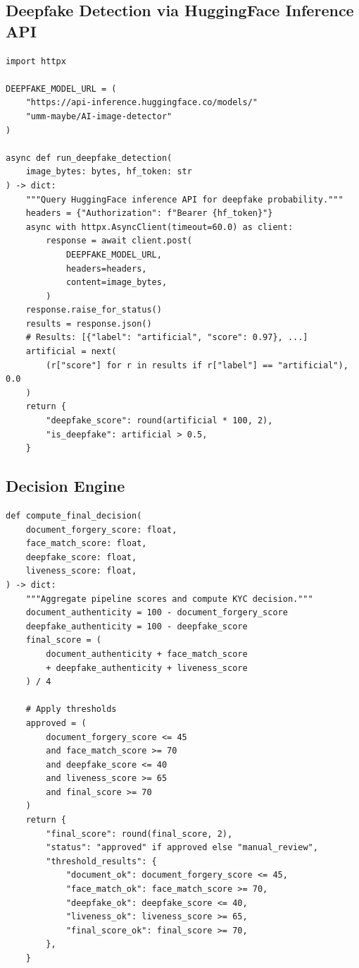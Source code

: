 \subsection{Deepfake Detection via HuggingFace Inference API}

\begin{lstlisting}[style=pythonstyle, caption=HuggingFace Deepfake Detection Client]
import httpx

DEEPFAKE_MODEL_URL = (
    "https://api-inference.huggingface.co/models/"
    "umm-maybe/AI-image-detector"
)

async def run_deepfake_detection(
    image_bytes: bytes, hf_token: str
) -> dict:
    """Query HuggingFace inference API for deepfake probability."""
    headers = {"Authorization": f"Bearer {hf_token}"}
    async with httpx.AsyncClient(timeout=60.0) as client:
        response = await client.post(
            DEEPFAKE_MODEL_URL,
            headers=headers,
            content=image_bytes,
        )
    response.raise_for_status()
    results = response.json()
    # Results: [{"label": "artificial", "score": 0.97}, ...]
    artificial = next(
        (r["score"] for r in results if r["label"] == "artificial"), 0.0
    )
    return {
        "deepfake_score": round(artificial * 100, 2),
        "is_deepfake": artificial > 0.5,
    }
\end{lstlisting}

\subsection{Decision Engine}

\begin{lstlisting}[style=pythonstyle, caption=Decision Engine Logic]
def compute_final_decision(
    document_forgery_score: float,
    face_match_score: float,
    deepfake_score: float,
    liveness_score: float,
) -> dict:
    """Aggregate pipeline scores and compute KYC decision."""
    document_authenticity = 100 - document_forgery_score
    deepfake_authenticity = 100 - deepfake_score
    final_score = (
        document_authenticity + face_match_score
        + deepfake_authenticity + liveness_score
    ) / 4

    # Apply thresholds
    approved = (
        document_forgery_score <= 45
        and face_match_score >= 70
        and deepfake_score <= 40
        and liveness_score >= 65
        and final_score >= 70
    )
    return {
        "final_score": round(final_score, 2),
        "status": "approved" if approved else "manual_review",
        "threshold_results": {
            "document_ok": document_forgery_score <= 45,
            "face_match_ok": face_match_score >= 70,
            "deepfake_ok": deepfake_score <= 40,
            "liveness_ok": liveness_score >= 65,
            "final_score_ok": final_score >= 70,
        },
    }
\end{lstlisting}


